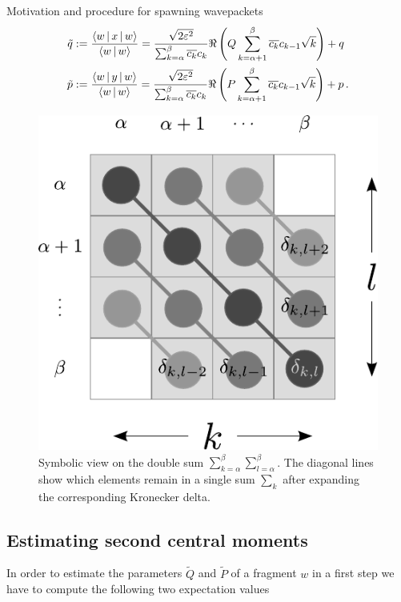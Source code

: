 \begin{chapter}{Motivation and procedure for spawning wavepackets}
\begin{align}
  \tilde{q} & := \frac{\Braket{w | x | w}}{\Braket{w|w}}
            = \frac{\sqrt{2 \varepsilon^2}}{\sum_{k=\alpha}^\beta \overline{c_k} c_k} \Re \left(Q \sum_{k=\alpha+1}^\beta \overline{c_k} c_{k-1} \sqrt{k} \right) + q 
            \label{eq:estimate_pos} \\
  \tilde{p} & := \frac{\Braket{w | y | w}}{\Braket{w|w}}
            = \frac{\sqrt{2 \varepsilon^2}}{\sum_{k=\alpha}^\beta \overline{c_k} c_k} \Re \left(P \sum_{k=\alpha+1}^\beta \overline{c_k} c_{k-1} \sqrt{k} \right) + p \,.
            \label{eq:estimate_mom}
\end{align}

\begin{figure}
  \centering
  \includegraphics{./figures/sumgrid.pdf}
  \caption[Symbolic view on the double sum]{Symbolic view on the double sum
  $\sum_{k=\alpha}^\beta \sum_{l=\alpha}^\beta$. The diagonal lines show which
  elements remain in a single sum $\sum_k$ after expanding the corresponding
  Kronecker delta.}
  \label{fig:sumgrid}
\end{figure}

\subsection{Estimating second central moments}

In order to estimate the parameters $\tilde{Q}$ and $\tilde{P}$ of a fragment $w$
in a first step we have to compute the following two expectation values


\end{chapter}
